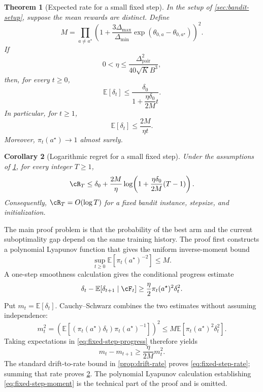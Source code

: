 \documentclass[11pt,twoside]{article}
\newcommand{\E}{\mathbb E}
\newtheorem{theorem}{Theorem}[section]
\newtheorem{corollary}[theorem]{Corollary}
\theoremstyle{definition}
\theoremstyle{remark}
\begin{document}
\begin{theorem}[Expected rate for a small fixed step]
\label{thm:fixed-step-rate}
In the setup of \cref{sec:bandit-setup}, suppose the mean rewards are
distinct. Define
\begin{equation}
 M=\prod_{a\ne a^\star}
 \left(1+\frac{3\Delta_{\max}}{\Delta_{\min}}
 \exp(\theta_{0,a}-\theta_{0,a^\star})\right)^2.
 \label{eq:fixed-step-constant}
\end{equation}
If
\begin{equation}
 0<\eta\le\frac{\Delta_{\mathrm{pair}}^2}{40\sqrt K B^3},
 \label{eq:fixed-step-condition}
\end{equation}
then, for every $t\ge0$,
\begin{equation}
 \E[\delta_t]
 \le\frac{\delta_0}
 {1+\dfrac{\eta\delta_0}{2M}t}.
 \label{eq:fixed-step-rate}
\end{equation}
In particular, for $t\ge1$,
\[
 \E[\delta_t]\le\frac{2M}{\eta t}.
\]
Moreover, $\pi_t(a^\star)\to1$ almost surely.
\end{theorem}

\begin{corollary}[Logarithmic regret for a small fixed step]
\label{cor:fixed-step-regret}
Under the assumptions of \cref{thm:fixed-step-rate}, for every integer
$T\ge1$,
\[
 \cR_T\le \delta_0+\frac{2M}{\eta}
 \log\!\left(1+\frac{\eta\delta_0}{2M}(T-1)\right).
\]
Consequently, $\cR_T=O(\log T)$ for a fixed bandit instance, stepsize,
and initialization.
\end{corollary}

The main proof problem is that the probability of the best arm and the
current suboptimality gap depend on the same training history. The proof
first constructs a polynomial Lyapunov function that gives the uniform
inverse-moment bound
\begin{equation}
 \sup_{t\ge0}\E[\pi_t(a^\star)^{-2}]\le M.
 \label{eq:fixed-step-moment}
\end{equation}
A one-step smoothness calculation gives the conditional progress estimate
\begin{equation}
 \delta_t-\E[\delta_{t+1}\mid\cF_t]
 \ge\frac{\eta}{2}\pi_t(a^\star)^2\delta_t^2.
 \label{eq:fixed-step-progress}
\end{equation}
Put $m_t=\E[\delta_t]$. Cauchy--Schwarz combines the two estimates without
assuming independence:
\[
 m_t^2
 =\left(\E[(\pi_t(a^\star)\delta_t)\pi_t(a^\star)^{-1}]\right)^2
 \le M\E[\pi_t(a^\star)^2\delta_t^2].
\]
Taking expectations in \cref{eq:fixed-step-progress} therefore yields
\begin{equation}
 m_t-m_{t+1}\ge\frac{\eta}{2M}m_t^2.
 \label{eq:fixed-step-recurrence}
\end{equation}
The standard drift-to-rate bound in \cref{prop:drift-rate} proves
\cref{eq:fixed-step-rate}; summing that rate proves
\cref{cor:fixed-step-regret}. The polynomial Lyapunov calculation establishing
\cref{eq:fixed-step-moment} is the technical part of the proof and is omitted.
\end{document}
